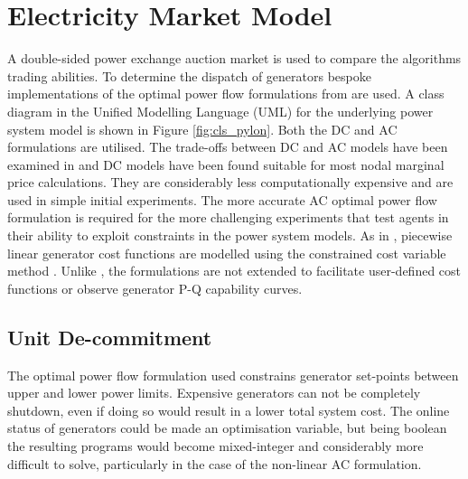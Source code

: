 \section{Electricity Market Model}
A double-sided power exchange auction market is used to compare the
algorithms trading abilities.  To determine the dispatch of generators bespoke
implementations of the optimal power flow formulations from \matpower
\cite[\S5]{pserc:mp_manual} are used.  A class diagram in the Unified Modelling
Language (UML) for the underlying power system model is shown in Figure
\ref{fig:cls_pylon}.  Both the DC and AC formulations are utilised. The
trade-offs between DC and AC models have been examined in 
and DC models have been found suitable for most nodal marginal price
calculations.  They are considerably less computationally expensive and are
used in simple initial experiments.  The more accurate AC optimal power flow
formulation is required for the more challenging experiments that test agents
in their ability to exploit constraints in the power system models. As
in \matpower, piecewise linear generator cost functions are modelled using the
constrained cost variable method \cite{zimmerman:ccv}.  Unlike \matpower, the
formulations are not extended to facilitate user-defined cost functions or
observe generator P-Q capability curves.

%

\subsection{Unit De-commitment}
The optimal power flow formulation used constrains generator set-points
between upper and lower power limits.  Expensive generators can not be
completely shutdown, even if doing so would result in a lower total system
cost.  The online status of generators could be made an optimisation variable,
but being boolean the resulting programs would become mixed-integer and
considerably more difficult to solve, particularly in the case of the
non-linear AC formulation.


